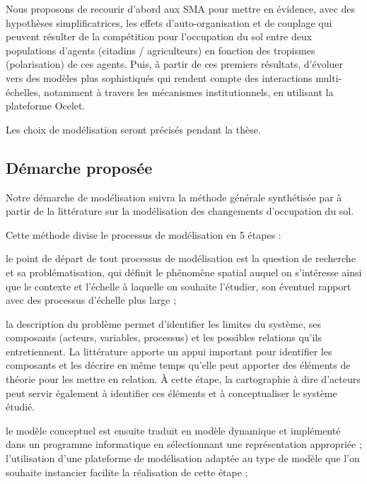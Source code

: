 Nous proposons de recourir d'abord aux SMA pour
mettre en évidence, avec des hypothèses simplificatrices,
les effets d'auto-organisation et de couplage
qui peuvent résulter de la compétition pour l'occupation du sol
entre deux populations d'agents (citadins / agriculteurs)
en fonction des tropismes (polarisation) de ces agents.
Puis, à partir de ces premiers résultats,
d'évoluer vers des modèles plus sophistiqués qui rendent compte
des interactions multi-échelles, notamment à travers les mécanismes institutionnels,
en utilisant la plateforme Ocelet.

Les choix de modélisation seront précisés pendant la thèse.


\subsection{Démarche proposée}

Notre démarche de modélisation suivra la méthode générale synthétisée par \citet{magliocca_metastudies_2015}
à partir de la littérature sur la modélisation des changements d'occupation du sol.

\startplacefigure[location=middle,title={Processus de modélisation}]
\stopplacefigure

Cette méthode divise le processus de modélisation en 5 étapes :

\startitemize[n]

\item le point de départ de tout processus de modélisation
   est la question de recherche et sa problématisation,
   qui définit le phénomène spatial auquel on s'intéresse
   ainsi que le contexte et l'échelle à laquelle on souhaite l'étudier,
   son éventuel rapport avec des processus d'échelle plus large ;

\item la description du problème permet d'identifier les limites du système,
   ses composants (acteurs, variables, processus)
   et les possibles relations qu'ils entretiennent.
   La littérature apporte
   un appui important pour identifier les composants et
   les décrire en même temps qu'elle peut apporter
   des éléments de théorie pour les mettre en relation.
   À cette étape, la cartographie à dire d'acteurs peut
   servir également à identifier ces éléments et à conceptualiser
   le système étudié.

\item le modèle conceptuel est ensuite traduit en modèle dynamique
   et implémenté dans un programme informatique
   en sélectionnant une représentation appropriée ;
   l'utilisation d'une plateforme de modélisation
   adaptée au type de modèle que l'on souhaite instancier
   facilite la réalisation de cette étape ;

